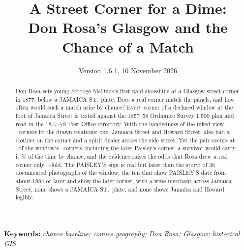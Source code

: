 \documentclass[10pt,a4paper]{article}
\title{A Street Corner for a Dime:\\ \normalsize Don Rosa's Glasgow and the Chance of a Match}
\author{\authorblock}
\date{Version 1.6.1, 16 November 2026}
\begin{document}
\maketitle

\begin{abstract}
Don Rosa sets young Scrooge McDuck's first paid shoeshine at a Glasgow street corner in 1877, below a JAMAICA ST.\ plate. Does a real corner match the panels, and how often would such a match arise by chance? Every corner of a declared window at the foot of Jamaica Street is tested against the 1857--58 Ordnance Survey 1:500 plan and read in the 1877--78 Post Office directory. With the handedness of the inked view, \nSurv\ corners fit the drawn relations; one, Jamaica Street and Howard Street, also had a clothier on the corner and a spirit dealer across the side street. Yet the pair occurs at \MatchHandStrict\ of the window's \nPop\ corners, including the later Paisley's corner: a survivor would carry it \ChanceHandStrict\% of the time by chance, and the evidence raises the odds that Rosa drew a real corner only \BFloHandStrict--\BFhiHandStrict-fold. The PAISLEY'S sign is real but later than the story: of 38 documented photographs of the window, the ten that show PAISLEY'S date from about 1884 or later and show the later corner, with a wine merchant across Jamaica Street; none shows a JAMAICA ST.\ plate, and none shows Jamaica and Howard legibly.
\end{abstract}

\noindent\textbf{Keywords:} \emph{chance baseline; comics geography; Don Rosa; Glasgow; historical GIS}
\end{document}
